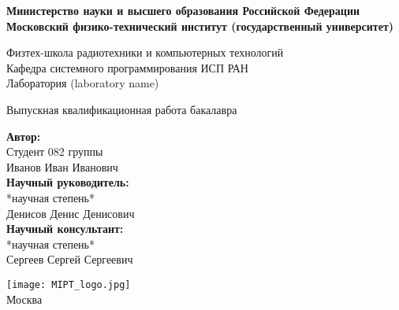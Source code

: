 \begin{center}
    \large\textbf{Министерство науки и высшего образования Российской Федерации\\
    Московский физико-технический институт (государственный
    университет)} \\
    \vspace{1cm}

    Физтех-школа радиотехники и компьютерных технологий \\

    Кафедра системного программирования ИСП РАН \\
    Лаборатория (laboratory name)\\

    \vspace{3em}

    Выпускная квалификационная работа бакалавра
\end{center}

\begin{center}
    \vspace{\fill}
    \LARGE{}

    \vspace{\fill}
\end{center}


\begin{flushright}
    \textbf{Автор:} \\
    Студент 082 группы \\
    Иванов Иван Иванович \\
    \vspace{2em}
    \textbf{Научный руководитель:} \\
    *научная степень* \\
    Денисов Денис Денисович \\
    \vspace{2em}
    \textbf{Научный консультант:} \\
    *научная степень* \\
    Сергеев Сергей Сергеевич \\
\end{flushright}

\vspace{7em}

\begin{center}
    \texttt{[image: MIPT\_logo.jpg]}\\
    Москва \the\year{}
\end{center}

\thispagestyle{empty}

\newpage
\setcounter{page}{2}
\fancyfoot[c]{\thepage}
\fancyhead[L]{}
\fancyhead[R]{}
